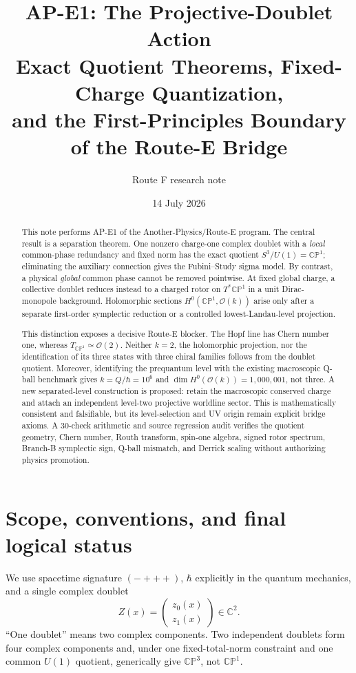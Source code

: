 \documentclass[11pt]{article}
\title{AP-E1: The Projective-Doublet Action\\
Exact Quotient Theorems, Fixed-Charge Quantization,\\
and the First-Principles Boundary of the Route-E Bridge}
\author{Route F research note}
\date{14 July 2026}
\numberwithin{equation}{section}
\newcommand{\CP}{\mathbb{CP}}
\newcommand{\CC}{\mathbb C}
\newcommand{\cO}{\mathcal O}
\begin{document}
\maketitle

\begin{abstract}
This note performs AP-E1 of the Another-Physics/Route-E program.  The central
result is a separation theorem.  One nonzero charge-one complex doublet with a
\emph{local} common-phase redundancy and fixed norm has the exact quotient
\(S^3/U(1)=\CP^1\); eliminating the auxiliary connection gives the
Fubini--Study sigma model.  By contrast, a physical \emph{global} common phase
cannot be removed pointwise.  At fixed global charge, a collective doublet
reduces instead to a charged rotor on \(T^*\CP^1\) in a unit Dirac-monopole
background.  Holomorphic sections \(H^0(\CP^1,\cO(k))\) arise only after a
separate first-order symplectic reduction or a controlled lowest-Landau-level
projection.

This distinction exposes a decisive Route-E blocker.  The Hopf line has Chern
number one, whereas \(T_{\CP^1}\simeq\cO(2)\).  Neither \(k=2\), the
holomorphic projection, nor the identification of its three states with three
chiral families follows from the doublet quotient.  Moreover, identifying the
prequantum level with the existing macroscopic Q-ball benchmark gives
\(k=Q/\hbar=10^6\) and \(\dim H^0(\cO(k))=1{,}000{,}001\), not three.  A
new separated-level construction is proposed: retain the macroscopic conserved
charge and attach an independent level-two projective worldline sector.  This
is mathematically consistent and falsifiable, but its level-selection and UV
origin remain explicit bridge axioms.  A 30-check arithmetic and source
regression audit verifies the quotient geometry, Chern number, Routh transform,
spin-one algebra, signed rotor spectrum, Branch-B symplectic sign, Q-ball
mismatch, and Derrick scaling without authorizing physics promotion.
\end{abstract}

\tableofcontents

\section{Scope, conventions, and final logical status}

We use spacetime signature \((-+++ )\), \(\hbar\) explicitly in the quantum
mechanics, and a single complex doublet
\begin{equation}
 Z(x)=\begin{pmatrix}z_0(x)\\z_1(x)\end{pmatrix}\in\CC^2.
 \label{eq:doublet}
\end{equation}
``One doublet'' means two complex components.  Two independent doublets form
four complex components and, under one fixed-total-norm constraint and one
common \(U(1)\) quotient, generically give \(\CP^3\), not \(\CP^1\).
\end{document}
